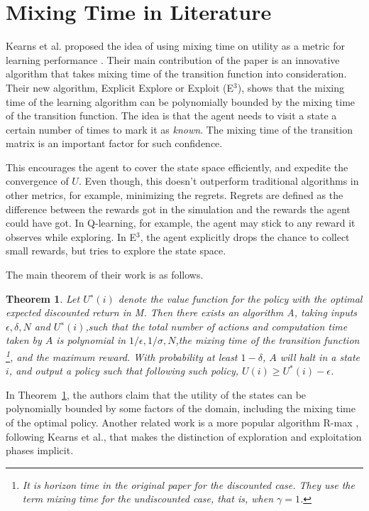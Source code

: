 \documentclass[10pt]{article}
\newtheorem{theorem}{Theorem}
\begin{document}
\section{Mixing Time in Literature}

Kearns et al. proposed the idea of using mixing time on utility as a metric for
learning performance \cite{kearns2002near}. Their main contribution of
the paper is an innovative algorithm that takes mixing time of the transition
function into consideration. Their new algorithm, Explicit Explore or Exploit
(E$^3$), shows that the mixing time of the learning algorithm can be
polynomially bounded by the mixing time of the transition function. The idea is
that the agent needs to visit a state a certain number of times to mark it as
{\em known}. The mixing time of the transition matrix is an important factor for
such confidence.

This encourages the agent to cover the state space efficiently, and expedite
the convergence of $U$. Even though, this doesn't outperform traditional
algorithms in other metrics, for example, minimizing the regrets. Regrets are
defined as the difference between the rewards got in the simulation and the
rewards the agent could have got. In Q-learning, for example, the agent may
stick to any reward it observes while exploring. In E$^3$, the agent explicitly
drops the chance to collect small rewards, but tries to explore the state space.

The main theorem of their work is as follows.

\begin{theorem}
\label{thm:e3}
Let $U^∗(i)$ denote the value function for the policy with the optimal expected
discounted return in M. Then there exists an algorithm A, taking inputs
$\epsilon,\delta,N$ and $U^∗(i)$,such  that  the  total  number  of  actions  and  computation
time  taken  by  $A$ is  polynomial  in $1/\epsilon,1/\sigma,N$,the mixing time
of the transition function \footnote{It is horizon time in the original paper
for the discounted case. They use the term mixing time for the undiscounted
case, that is, when $\gamma = 1$.}, and the maximum reward. With probability at
least $1-\delta$, $A$  will halt in a state $i$, and output a policy such that
following such policy, $U(i) \geq U^*(i) - \epsilon$.
\end{theorem}

In Theorem~\ref{thm:e3}, the authors claim that the utility of the states can be
polynomially bounded by some factors of the domain, including the mixing time of
the optimal policy.
Another related work is a more popular algorithm R-max \cite{rmax}, following
Kearns et al., that makes the distinction of exploration and exploitation phases
implicit.
\end{document}
